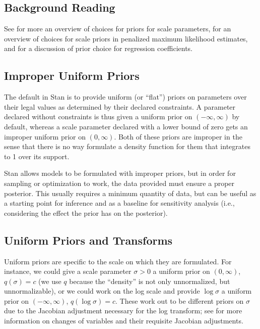 \subsection{Background Reading}

See \citep{Gelman:2006} for more an overview of choices for priors for
scale parameters, \citep{ChungEtAl:2013} for an overview of choices
for scale priors in penalized maximum likelihood estimates, and
\cite{GelmanJakulinPittauEtAl:2008} for a discussion of prior choice
for regression coefficients.

\subsection{Improper Uniform Priors}

The default in Stan is to provide uniform (or ``flat'') priors on
parameters over their legal values as determined by their declared
constraints.  A parameter declared without constraints is thus given a
uniform prior on $(-\infty,\infty)$ by default, whereas a scale
parameter declared with a lower bound of zero gets an improper uniform
prior on $(0,\infty)$.  Both of these priors are improper in the sense
that there is no way formulate a density function for them that
integrates to 1 over its support.

Stan allows models to be formulated with improper priors, but in order
for sampling or optimization to work, the data provided must ensure a
proper posterior.  This usually requires a minimum quantity of data,
but can be useful as a starting point for inference and as a baseline
for sensitivity analysis (i.e., considering the effect the prior
has on the posterior).

\subsection{Uniform Priors and Transforms}

Uniform priors are specific to the scale on which they are formulated.
For instance, we could give a scale parameter $\sigma > 0$ a uniform
prior on $(0,\infty)$, $q(\sigma) = c$ (we use $q$ because the
``density'' is not only unnormalized, but unnormalizable), or we could
work on the log scale and provide $\log \sigma$ a uniform prior on
$(-\infty,\infty)$, $q(\log \sigma) = c$.  These work out to be
different priors on $\sigma$ due to the Jacobian adjustment necessary
for the log transform; see  for more
information on changes of variables and their requisite Jacobian
adjustments.

